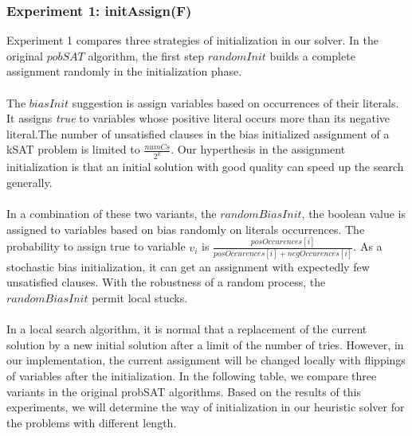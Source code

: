 \documentclass[12pt,a4paper,twoside]{scrartcl}
\numberwithin{equation}{section}
\begin{document}
\subsubsection{Experiment 1: initAssign(F)}
\label{sec:Experiment 1}
Experiment 1 compares three strategies of initialization in our solver. In the original $pobSAT$ algorithm, the first step $randomInit$  builds a complete assignment randomly in the initialization phase. \\ \\The $biasInit$ suggestion is assign variables based on occurrences of their literals. It assigns \emph{true} to variables whose positive literal occurs more than its negative literal.The number of unsatisfied clauses in the bias initialized assignment of a kSAT problem is limited to $\frac{numCs}{2^k}$. Our hyperthesis in the assignment initialization is that an initial solution with good quality can speed up the search generally. \\ \\ In a combination of these two variants, the $randomBiasInit$, the boolean value is assigned to variables based on bias randomly on literals occurrences. The probability to assign true to variable $v_i$ is $\frac{posOccurences[i]}{posOccurences[i]+negOccurences[i]}$. As a stochastic bias initialization, it can get an assignment with expectedly few unsatisfied clauses. With the robustness of a random process, the $randomBiasInit$ permit local stucks. \\\\ In a local search algorithm, it is normal that a replacement of the current solution by a new initial solution after a limit of the number of tries. However, in our implementation, the current assignment will be changed locally with flippings of variables after the initialization. In the following table, we compare three variants in the original probSAT algorithms. Based on the results of this experiments, we will determine the way of initialization in our heuristic solver for the problems with different length. 
\\
\end{document}
